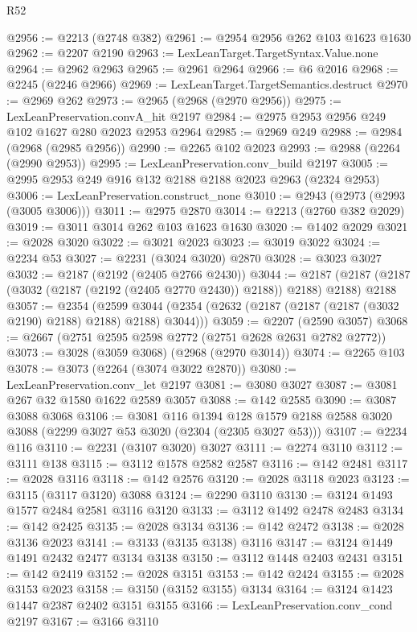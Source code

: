 \begin{lexlean}{R52}
\begin{coremodule}
@2956 := @2213 (@2748 @382)
@2961 := @2954 @2956 @262 @103 @1623 @1630
@2962 := @2207 @2190
@2963 := LexLeanTarget.TargetSyntax.Value.none
@2964 := @2962 @2963
@2965 := @2961 @2964
@2966 := @6 @2016
@2968 := @2245 (@2246 @2966)
@2969 := LexLeanTarget.TargetSemantics.destruct
@2970 := @2969 @262
@2973 := @2965 (@2968 (@2970 @2956))
@2975 := LexLeanPreservation.convA_hit @2197
@2984 := @2975 @2953 @2956 @249 @102 @1627 @280 @2023 @2953 @2964
@2985 := @2969 @249
@2988 := @2984 (@2968 (@2985 @2956))
@2990 := @2265 @102 @2023
@2993 := @2988 (@2264 (@2990 @2953))
@2995 := LexLeanPreservation.conv_build @2197
@3005 := @2995 @2953 @249 @916 @132 @2188 @2188 @2023 @2963 (@2324 @2953)
@3006 := LexLeanPreservation.construct_none
@3010 := @2943 (@2973 (@2993 (@3005 @3006)))
@3011 := @2975 @2870
@3014 := @2213 (@2760 @382 @2029)
@3019 := @3011 @3014 @262 @103 @1623 @1630
@3020 := @1402 @2029
@3021 := @2028 @3020
@3022 := @3021 @2023
@3023 := @3019 @3022
@3024 := @2234 @53
@3027 := @2231 (@3024 @3020) @2870
@3028 := @3023 @3027
@3032 := @2187 (@2192 (@2405 @2766 @2430))
@3044 := @2187 (@2187 (@2187 (@3032 (@2187 (@2192 (@2405 @2770 @2430)) @2188)) @2188) @2188) @2188
@3057 := @2354
    (@2599 @3044 (@2354 (@2632 (@2187 (@2187 (@2187 (@3032 @2190) @2188) @2188) @2188) @3044)))
@3059 := @2207 (@2590 @3057)
@3068 := @2667 (@2751 @2595 @2598 @2772 (@2751 @2628 @2631 @2782 @2772))
@3073 := @3028 (@3059 @3068) (@2968 (@2970 @3014))
@3074 := @2265 @103
@3078 := @3073 (@2264 (@3074 @3022 @2870))
@3080 := LexLeanPreservation.conv_let @2197
@3081 := @3080 @3027
@3087 := @3081 @267 @32 @1580 @1622 @2589 @3057
@3088 := @142 @2585
@3090 := @3087 @3088 @3068
@3106 := @3081
    @116
    @1394
    @128
    @1579
    @2188
    @2588
    @3020
    @3088
    (@2299 @3027 @53 @3020 (@2304 (@2305 @3027 @53)))
@3107 := @2234 @116
@3110 := @2231 (@3107 @3020) @3027
@3111 := @2274 @3110
@3112 := @3111 @138
@3115 := @3112 @1578 @2582 @2587
@3116 := @142 @2481
@3117 := @2028 @3116
@3118 := @142 @2576
@3120 := @2028 @3118 @2023
@3123 := @3115 (@3117 @3120) @3088
@3124 := @2290 @3110
@3130 := @3124 @1493 @1577 @2484 @2581 @3116 @3120
@3133 := @3112 @1492 @2478 @2483
@3134 := @142 @2425
@3135 := @2028 @3134
@3136 := @142 @2472
@3138 := @2028 @3136 @2023
@3141 := @3133 (@3135 @3138) @3116
@3147 := @3124 @1449 @1491 @2432 @2477 @3134 @3138
@3150 := @3112 @1448 @2403 @2431
@3151 := @142 @2419
@3152 := @2028 @3151
@3153 := @142 @2424
@3155 := @2028 @3153 @2023
@3158 := @3150 (@3152 @3155) @3134
@3164 := @3124 @1423 @1447 @2387 @2402 @3151 @3155
@3166 := LexLeanPreservation.conv_cond @2197
@3167 := @3166 @3110

\end{coremodule}
\end{lexlean}
